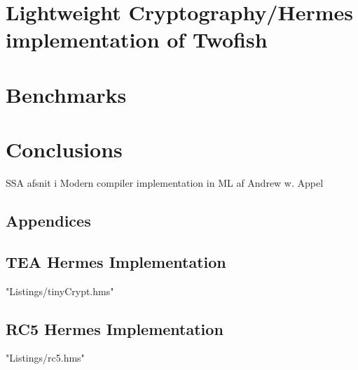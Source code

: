 \documentclass[a4paper,10pt,openright]{memoir}
\begin{document}
%
%
%
%
%
%

\chapter{Lightweight Cryptography/Hermes implementation of Twofish}
\label{chapt - Hermes implementation}

%
%
%

\chapter{Benchmarks}
\label{chapt - Benchmarks}


\chapter{Conclusions}
\label{chapt - Conclusion}







\newpage
\renewcommand\bibname{References}


SSA afsnit i Modern compiler implementation in ML af Andrew w. Appel

\clearpage
\newpage
\begin{appendices}
\renewcommand*{\lstlistingname}{Appendix}
\chapter{Appendices}
\section{TEA Hermes Implementation}
\label{code:TEA_Full_Imp}
 {"Listings/tinyCrypt.hms"}
\newpage
\section{RC5 Hermes Implementation}
\label{code:RC5_Full_Imp}
 {"Listings/rc5.hms"}

\end{appendices}
\end{document}
